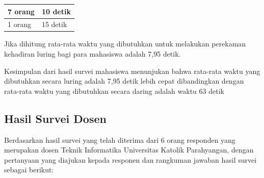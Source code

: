 \documentclass[a4paper,twoside]{article}
\begin{document}
\begin{enumerate}
\begin{enumerate}
\begin{table}[ht]
\begin{tabular}{|p{4cm} |p{7cm}|}
					7 orang &  10 detik\\ \hline 
					1 orang &  15 detik\\ \hline
				\end{tabular}
				\label{tab:luringMahasiswa}
			\end{table}
			\newpage
			Jika dihitung rata-rata waktu yang dibutuhkan untuk melakukan perekaman kehadiran luring bagi para mahasiswa adalah 7,95 detik.
		\end{enumerate}
		Kesimpulan dari hasil survei mahasiswa menunjukan bahwa rata-rata waktu yang dibutuhkan secara luring adalah 7,95 detik lebih cepat dibandingkan dengan rata-rata waktu yang dibutuhkan secara daring adalah waktu 63 detik
		
		\subsection{Hasil Survei Dosen}
		Berdasarkan hasil survei yang telah diterima dari 6 orang responden yang merupakan dosen Teknik Informatika Universitas Katolik Parahyangan, dengan pertanyaan yang diajukan kepada responen dan rangkuman jawaban hasil survei sebagai berikut:


\end{enumerate}
\end{document}
